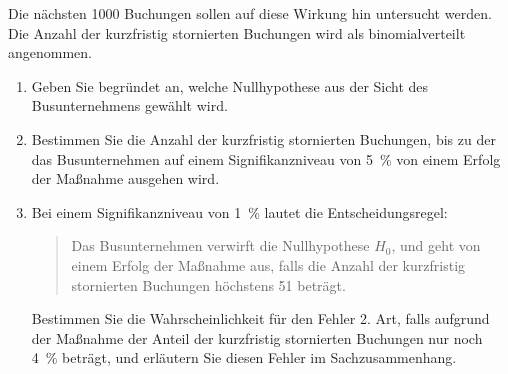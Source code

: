 \begin{exercise}
\begin{enumerate}[a)]
            Die nächsten \num{1000} Buchungen sollen auf
            diese Wirkung hin untersucht werden. Die
            Anzahl der kurzfristig stornierten Buchungen
            wird als binomialverteilt angenommen.
            \begin{enumerate}[(1)]
              \item Geben Sie begründet an, welche
                    Nullhypothese aus der Sicht des
                    Busunternehmens gewählt wird.
              \item Bestimmen Sie die Anzahl der
                    kurzfristig stornierten Buchungen,
                    bis zu der das Busunternehmen auf
                    einem Signifikanzniveau von
                    \SI{5}{\percent} von einem Erfolg
                    der Maßnahme ausgehen wird.
              \item Bei einem Signifikanzniveau von
                    \SI{1}{\percent} lautet die
                    Entscheidungsregel:
                    \begin{quote}
                      \glqq
                      Das Busunternehmen verwirft die
                      Nullhypothese $H_0$, und geht von
                      einem Erfolg der Maßnahme aus,
                      falls die Anzahl der kurzfristig
                      stornierten Buchungen höchstens
                      \num{51} beträgt.
                      \grqq
                    \end{quote}
                    Bestimmen Sie die Wahrscheinlichkeit
                    für den Fehler 2. Art, falls aufgrund
                    der Maßnahme der Anteil der
                    kurzfristig stornierten Buchungen nur
                    noch \SI{4}{\percent} beträgt, und
                    erläutern Sie diesen Fehler im
                    Sachzusammenhang.
            \end{enumerate}
    \end{enumerate}
  \fi
\end{exercise}
